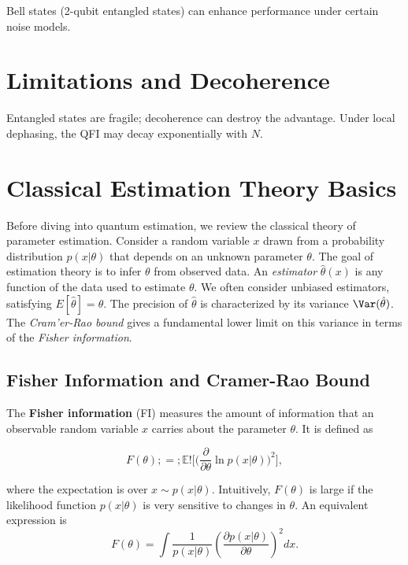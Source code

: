 Bell states (2-qubit entangled states) can enhance performance under
certain noise models.

\section{Limitations and Decoherence}

Entangled states are fragile; decoherence can destroy the
advantage. Under local dephasing, the QFI may decay exponentially with
$N$.




\section{Classical Estimation Theory Basics}

\label{sec:classical}



Before diving into quantum estimation, we review the classical theory
of parameter estimation. Consider a random variable $x$ drawn from a
probability distribution $p(x|\theta)$ that depends on an unknown
parameter $\theta$. The goal of estimation theory is to infer $\theta$
from observed data. An \textit{estimator} $\hat{\theta}(x)$ is any
function of the data used to estimate $\theta$. We often consider
unbiased estimators, satisfying $E[\hat{\theta}] = \theta$. The
precision of $\hat{\theta}$ is characterized by its variance
$\Var(\hat{\theta})$. The \textit{Cram'er-Rao bound} gives a
fundamental lower limit on this variance in terms of the
\textit{Fisher information}.



\subsection{Fisher Information and Cramer-Rao Bound}



The \textbf{Fisher information} (FI) measures the amount of
information that an observable random variable $x$ carries about the
parameter $\theta$. It is defined as

\begin{equation}
F(\theta) ;=; \mathbb{E}!\Bigg[\Big(\frac{\partial}{\partial \theta}\ln p(x|\theta)\Big)^2\Bigg],
\label{eq:FI-def}
\end{equation}

where the expectation is over $x\sim p(x|\theta)$. Intuitively,
$F(\theta)$ is large if the likelihood function $p(x|\theta)$ is very
sensitive to changes in $\theta$. An equivalent expression is
\[
F(\theta) = \int \frac{1}{p(x|\theta)}\left(\frac{\partial p(x|\theta)}{\partial \theta}\right)^2 dx.
\]


